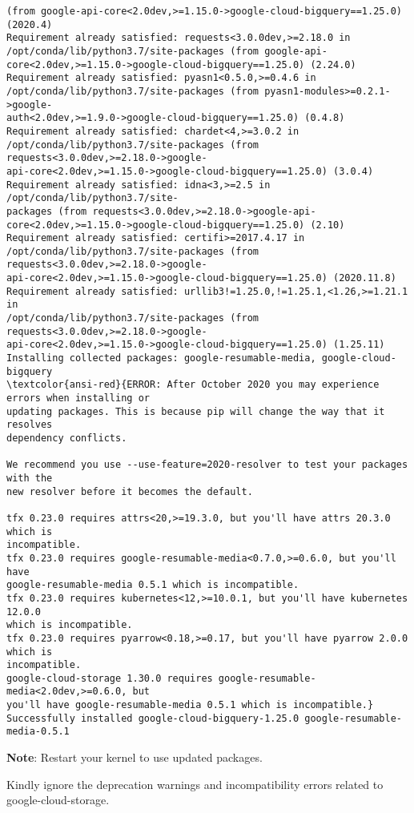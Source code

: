 \documentclass[11pt]{article}
\begin{document}
\begin{Verbatim}[commandchars=\\\{\}]
(from google-api-core<2.0dev,>=1.15.0->google-cloud-bigquery==1.25.0) (2020.4)
Requirement already satisfied: requests<3.0.0dev,>=2.18.0 in
/opt/conda/lib/python3.7/site-packages (from google-api-
core<2.0dev,>=1.15.0->google-cloud-bigquery==1.25.0) (2.24.0)
Requirement already satisfied: pyasn1<0.5.0,>=0.4.6 in
/opt/conda/lib/python3.7/site-packages (from pyasn1-modules>=0.2.1->google-
auth<2.0dev,>=1.9.0->google-cloud-bigquery==1.25.0) (0.4.8)
Requirement already satisfied: chardet<4,>=3.0.2 in
/opt/conda/lib/python3.7/site-packages (from requests<3.0.0dev,>=2.18.0->google-
api-core<2.0dev,>=1.15.0->google-cloud-bigquery==1.25.0) (3.0.4)
Requirement already satisfied: idna<3,>=2.5 in /opt/conda/lib/python3.7/site-
packages (from requests<3.0.0dev,>=2.18.0->google-api-
core<2.0dev,>=1.15.0->google-cloud-bigquery==1.25.0) (2.10)
Requirement already satisfied: certifi>=2017.4.17 in
/opt/conda/lib/python3.7/site-packages (from requests<3.0.0dev,>=2.18.0->google-
api-core<2.0dev,>=1.15.0->google-cloud-bigquery==1.25.0) (2020.11.8)
Requirement already satisfied: urllib3!=1.25.0,!=1.25.1,<1.26,>=1.21.1 in
/opt/conda/lib/python3.7/site-packages (from requests<3.0.0dev,>=2.18.0->google-
api-core<2.0dev,>=1.15.0->google-cloud-bigquery==1.25.0) (1.25.11)
Installing collected packages: google-resumable-media, google-cloud-bigquery
\textcolor{ansi-red}{ERROR: After October 2020 you may experience errors when installing or
updating packages. This is because pip will change the way that it resolves
dependency conflicts.

We recommend you use --use-feature=2020-resolver to test your packages with the
new resolver before it becomes the default.

tfx 0.23.0 requires attrs<20,>=19.3.0, but you'll have attrs 20.3.0 which is
incompatible.
tfx 0.23.0 requires google-resumable-media<0.7.0,>=0.6.0, but you'll have
google-resumable-media 0.5.1 which is incompatible.
tfx 0.23.0 requires kubernetes<12,>=10.0.1, but you'll have kubernetes 12.0.0
which is incompatible.
tfx 0.23.0 requires pyarrow<0.18,>=0.17, but you'll have pyarrow 2.0.0 which is
incompatible.
google-cloud-storage 1.30.0 requires google-resumable-media<2.0dev,>=0.6.0, but
you'll have google-resumable-media 0.5.1 which is incompatible.}
Successfully installed google-cloud-bigquery-1.25.0 google-resumable-media-0.5.1
    \end{Verbatim}

    \textbf{Note}: Restart your kernel to use updated packages.

    Kindly ignore the deprecation warnings and incompatibility errors
related to google-cloud-storage.
\end{document}
